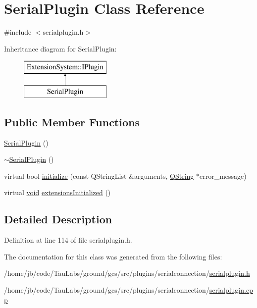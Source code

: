 \hypertarget{class_serial_plugin}{\section{\-Serial\-Plugin \-Class \-Reference}
\label{class_serial_plugin}
}


{\ttfamily \#include $<$serialplugin.\-h$>$}

\-Inheritance diagram for \-Serial\-Plugin\-:\begin{figure}[H]
\begin{center}
\leavevmode
\includegraphics[height=2.000000cm]{class_serial_plugin}
\end{center}
\end{figure}
\subsection*{\-Public \-Member \-Functions}
\begin{DoxyCompactItemize}
\item 
\hyperlink{group___serial_plugin_ga61918aa34cb91654613f5ae3e2992cb5}{\-Serial\-Plugin} ()
\item 
\hyperlink{group___serial_plugin_gaed0afbd615d41b58d07b4916f4c9e277}{$\sim$\-Serial\-Plugin} ()
\item 
virtual bool \hyperlink{group___serial_plugin_ga06e1847534162b254c0790b2221e2836}{initialize} (const \-Q\-String\-List \&arguments, \hyperlink{group___u_a_v_objects_plugin_gab9d252f49c333c94a72f97ce3105a32d}{\-Q\-String} $\ast$error\-\_\-message)
\item 
virtual \hyperlink{group___u_a_v_objects_plugin_ga444cf2ff3f0ecbe028adce838d373f5c}{void} \hyperlink{group___serial_plugin_ga513ef44cd1747f6859255f102fc9f845}{extensions\-Initialized} ()
\end{DoxyCompactItemize}


\subsection{\-Detailed \-Description}


\-Definition at line 114 of file serialplugin.\-h.



\-The documentation for this class was generated from the following files\-:\begin{DoxyCompactItemize}
\item 
/home/jb/code/\-Tau\-Labs/ground/gcs/src/plugins/serialconnection/\hyperlink{serialplugin_8h}{serialplugin.\-h}\item 
/home/jb/code/\-Tau\-Labs/ground/gcs/src/plugins/serialconnection/\hyperlink{serialplugin_8cpp}{serialplugin.\-cpp}\end{DoxyCompactItemize}
